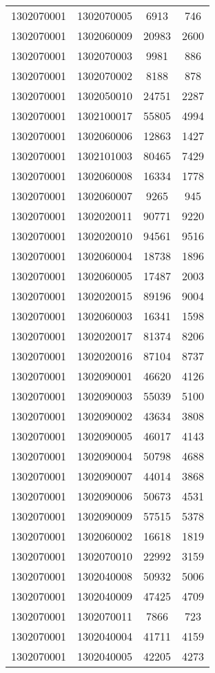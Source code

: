 \begin{longtable}{llcc}
1302070001 & 1302070005 & 6913 & 746\\
1302070001 & 1302060009 & 20983 & 2600\\
1302070001 & 1302070003 & 9981 & 886\\
1302070001 & 1302070002 & 8188 & 878\\
1302070001 & 1302050010 & 24751 & 2287\\
1302070001 & 1302100017 & 55805 & 4994\\
1302070001 & 1302060006 & 12863 & 1427\\
1302070001 & 1302101003 & 80465 & 7429\\
1302070001 & 1302060008 & 16334 & 1778\\
1302070001 & 1302060007 & 9265 & 945\\
1302070001 & 1302020011 & 90771 & 9220\\
1302070001 & 1302020010 & 94561 & 9516\\
1302070001 & 1302060004 & 18738 & 1896\\
1302070001 & 1302060005 & 17487 & 2003\\
1302070001 & 1302020015 & 89196 & 9004\\
1302070001 & 1302060003 & 16341 & 1598\\
1302070001 & 1302020017 & 81374 & 8206\\
1302070001 & 1302020016 & 87104 & 8737\\
1302070001 & 1302090001 & 46620 & 4126\\
1302070001 & 1302090003 & 55039 & 5100\\
1302070001 & 1302090002 & 43634 & 3808\\
1302070001 & 1302090005 & 46017 & 4143\\
1302070001 & 1302090004 & 50798 & 4688\\
1302070001 & 1302090007 & 44014 & 3868\\
1302070001 & 1302090006 & 50673 & 4531\\
1302070001 & 1302090009 & 57515 & 5378\\
1302070001 & 1302060002 & 16618 & 1819\\
1302070001 & 1302070010 & 22992 & 3159\\
1302070001 & 1302040008 & 50932 & 5006\\
1302070001 & 1302040009 & 47425 & 4709\\
1302070001 & 1302070011 & 7866 & 723\\
1302070001 & 1302040004 & 41711 & 4159\\
1302070001 & 1302040005 & 42205 & 4273\\

\end{longtable}
